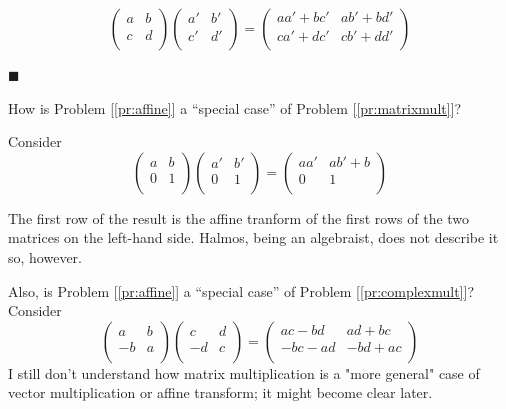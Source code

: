 \documentclass[english,notitlepage,smartquotes]{hgbreport}
\theoremstyle{definition}
\theoremstyle{definition}
\theoremstyle{remark}
\theoremstyle{plain}
\theoremstyle{definition}
\renewcommand\qedsymbol{$\blacksquare$}
\theoremstyle{definition}
\begin{document}
\[
  \begin{pmatrix}
    a & b\\
    c & d\\
  \end{pmatrix}
  \begin{pmatrix}
    a' & b'\\
    c' & d'\\
  \end{pmatrix}
  =
  \begin{pmatrix}
    aa'+bc' & ab'+bd'\\
    ca'+dc' & cb'+dd'\\
  \end{pmatrix}
\]

\qedsymbol

How is Problem [\ref{pr:affine}] a ``special case'' of Problem [\ref{pr:matrixmult}]?

Consider
\[
  \begin{pmatrix}
    a & b\\
    0 & 1\\
  \end{pmatrix}
  \begin{pmatrix}
    a' & b'\\
    0 & 1\\
  \end{pmatrix}
  =
  \begin{pmatrix}
    aa' & ab'+b\\
    0 & 1\\
  \end{pmatrix}
\]

The first row of the result is the affine tranform of the first rows of the two matrices on the left-hand side. Halmos, being an algebraist, does not describe it so, however. 

Also, is Problem [\ref{pr:affine}] a ``special case'' of Problem [\ref{pr:complexmult}]?
Consider
\[
  \begin{pmatrix}
    a & b\\
    -b & a\\
  \end{pmatrix}
  \begin{pmatrix}
    c & d\\
    -d & c\\
  \end{pmatrix}
  =
  \begin{pmatrix}
    ac-bd & ad+bc\\
    -bc-ad &-bd+ac\\
  \end{pmatrix}
\]
I still don't understand how matrix multiplication is a "more general" case of vector multiplication or affine transform; it might become clear later.
\end{document}
